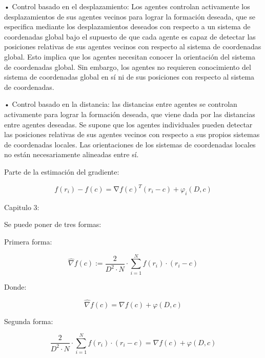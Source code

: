 • Control basado en el desplazamiento: Los agentes controlan activamente los desplazamientos de sus agentes vecinos para lograr la formación deseada, que se especifica mediante los desplazamientos deseados con respecto a un sistema de coordenadas global bajo el supuesto de que cada agente es capaz de detectar las posiciones relativas de sus agentes vecinos con respecto al sistema de coordenadas global. Esto implica que los agentes necesitan conocer la orientación del sistema de coordenadas global. Sin embargo, los agentes no requieren conocimiento del sistema de coordenadas global en sí ni de sus posiciones con respecto al sistema de coordenadas.

• Control basado en la distancia: las distancias entre agentes se controlan activamente para lograr la formación deseada, que viene dada por las distancias entre agentes deseadas. Se supone que los agentes individuales pueden detectar las posiciones relativas de sus agentes vecinos con respecto a sus propios sistemas de coordenadas locales. Las orientaciones de los sistemas de coordenadas locales no están necesariamente alineadas entre sí.

Parte de la estimación del gradiente:


\begin{equation*}
	f\left(r_{i}\right)-f\left(c\right)=\mathrm{\nabla}{f}\left(c\right)^{T}\left(r_{i}-c\right)+\varphi_{i}\left(D,c\right)
\end{equation*}




Capitulo 3:


Se puede poner de tres formas:

Primera forma:

\begin{equation*}
	\hat{\nabla}{f}\left(c\right):=\frac{2}{{D}^2\cdot{N}}\cdot\sum_{i=1}^{N}f(r_{i})\cdot(r_{i}-c)
\end{equation*}

Donde:

\begin{equation*}
	\hat{\nabla}{f}\left(c\right) = \nabla{f}\left(c\right) + \varphi\left(D,c\right)
\end{equation*}

Segunda forma:

\begin{equation*}
	\frac{2}{{D}^2\cdot{N}}\cdot\sum_{i=1}^{N}f(r_{i})\cdot(r_{i}-c)=\nabla{f}\left(c\right) + \varphi\left(D,c\right)
\end{equation*}


